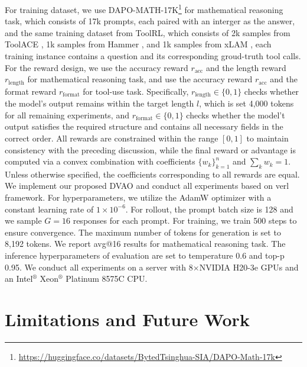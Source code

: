 \documentclass{llmxive}
\begin{document}
For training dataset, we use DAPO-MATH-17K\footnote{\url{https://huggingface.co/datasets/BytedTsinghua-SIA/DAPO-Math-17k}} for mathematical reasoning task, which consists of 17k prompts, each paired with an interger as the answer, and the same training dataset from ToolRL, which consists of 2k samples from ToolACE \citep{toolace}, 1k samples from Hammer \citep{hammer}, and 1k samples from xLAM \citep{xlam}, each training instance contains a question and its corresponding groud-truth tool calls. For the reward design, we use the accuracy reward $r_\text{acc}$ and the length reward $r_\text{length}$ for mathematical reasoning task, and use the accuracy reward $r_\text{acc}$ and the format reward $r_\text{format}$ for tool-use task. Specifically, $r_\text{length} \in \{0, 1\}$ checks whether the model's output remains within the target length $l$, which is set 4,000 tokens for all remaining experiments, and $r_\text{format} \in \{0,1\}$ checks whether the model't output satisfies the required structure and contains all necessary fields in the correct order. All rewards are constrained within the range $[0,1]$ to maintain consistency with the preceding discussion, while the final reward or advantage is computed via a convex combination with coefficients $\{w_k\}_{k=1}^n$ and $\sum_k w_k = 1$. Unless otherwise specified, the coefficients corresponding to all rewards are equal. We implement our proposed DVAO and conduct all experiments based on verl \citep{verl} framework. For hyperparameters, we utilize the AdamW \citep{adamw} optimizer with a constant learning rate of $1 \times 10^{-6}$. For rollout, the prompt batch size is 128 and we sample $G=16$ responses for each prompt. For training, we train 500 steps to ensure convergence. The maximum number of tokens for generation is set to 8,192 tokens. We report avg@16 results for mathematical reasoning task. The inference hyperparameters of evaluation are set to temperature 0.6 and top-p 0.95. We conduct all experiments on a server with 8$\times$NVIDIA H20-3e GPUs and an Intel$^\text{®}$ Xeon$^\text{®}$ Platinum 8575C CPU.

\section{Limitations and Future Work}
\label{appendix:limitation}
\end{document}

